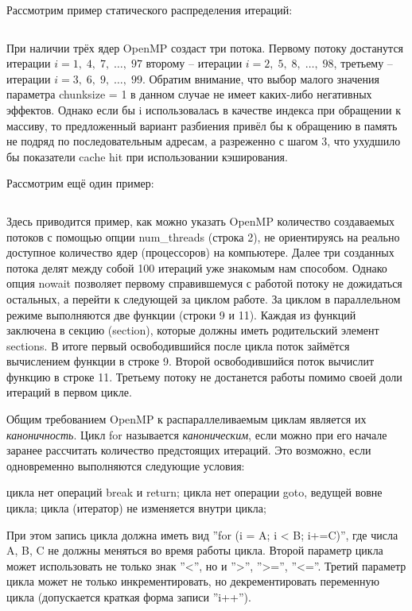 Рассмотрим пример статического распределения итераций:

\inputminted{c++}{listings/OpenMPExample13.cpp}

При наличии трёх ядер OpenMP создаст три потока. Первому потоку достанутся итерации $i=1,\;4,\;7,\;\dots,\;97$ второму – итерации $i=2,\;5,\;8,\;\dots,\;98$, третьему – итерации $i=3,\;6,\;9,\;\dots,\;99$. Обратим внимание, что выбор малого значения параметра chunk\textunderscore size = 1 в данном случае не имеет каких-либо негативных эффектов. Однако если бы i использовалась в качестве индекса при обращении к массиву, то предложенный вариант разбиения привёл бы к обращению в память не подряд по последовательным адресам, а разреженно с шагом 3, что ухудшило бы показатели cache hit при использовании кэширования.

Рассмотрим ещё один пример: 

\inputminted{c++}{listings/OpenMPExample14.cpp}

Здесь приводится пример, как можно указать OpenMP количество создаваемых потоков с помощью опции num\_threads (строка 2), не ориентируясь на реально доступное количество ядер (процессоров) на компьютере. Далее три созданных потока делят между собой 100 итераций уже знакомым нам способом. Однако опция nowait позволяет первому справившемуся с работой потоку не дожидаться остальных, а перейти к следующей за циклом работе. За циклом в параллельном режиме выполняются две функции (строки 9 и 11). Каждая из функций заключена в секцию (section), которые должны иметь родительский элемент sections. В итоге первый освободившийся после цикла поток займётся вычислением функции в строке 9. Второй освободившийся поток вычислит функцию в строке 11. Третьему потоку не достанется работы помимо своей доли итераций в первом цикле.

Общим требованием OpenMP к распараллеливаемым циклам является их \textit{каноничность}. Цикл for называется \textit{каноническим}, если можно при его начале заранее рассчитать количество предстоящих итераций. Это возможно, если одновременно выполняются следующие условия:

\begin{itemize}
     цикла нет операций break и return;
     цикла нет операции goto, ведущей вовне цикла;
     цикла (итератор) не изменяется внутри цикла;
\end{itemize}

При этом запись цикла должна иметь вид ''for (i = A; i < B; i+=C)'', где числа A, B, C не должны меняться во время работы цикла. Второй параметр цикла может использовать не только знак ''<'', но и  ''>'',  ''>='',  ''<=''. Третий параметр цикла может не только инкрементировать, но декрементировать переменную цикла (допускается краткая форма записи ''i++'').

